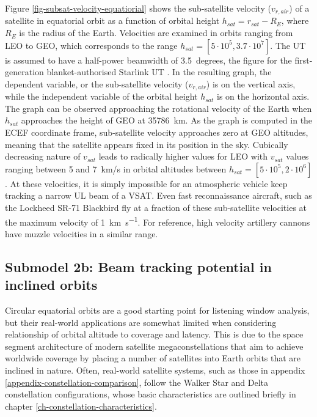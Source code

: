 \documentclass[english, 12pt, a4paper, elec, utf8, a-1b, online]{aaltothesis}
\begin{document}
Figure \ref{fig-subsat-velocity-equatiorial} shows the sub-satellite velocity ($v_{r, air}$) of a satellite in equatorial orbit as a function of orbital height $h_{sat} = r_{sat} - R_{E}$, where $R_{E}$ is the radius of the Earth.
Velocities are examined in orbits ranging from LEO to GEO, which corresponds to the range $h_{sat} = [5 \cdot 10^5, 3.7 \cdot 10^7]$. The UT is assumed to have a half-power beamwidth of 3.5~degrees, the figure for the first-generation blanket-authorised Starlink UT \cite{SpaceX-SES-AMD-20210731-01295}.
In the resulting graph, the dependent variable, or the sub-satellite velocity ($v_{r, air}$) is on the vertical axis, while the independent variable of the orbital height $h_{sat}$ is on the horizontal axis.
The graph can be observed approaching the rotational velocity of the Earth when $h_{sat}$ approaches the height of GEO at \SI{35786}{\kilo\meter}.
As the graph is computed in the ECEF coordinate frame, sub-satellite velocity approaches zero at GEO altitudes, meaning that the satellite appears fixed in its position in the sky.
Cubically decreasing nature of $v_{sat}$ leads to radically higher values for LEO with $v_{sat}$ values ranging between 5 and 7\ km/s in orbital altitudes between $h_{sat} = [5 \cdot 10^5, 2 \cdot 10^6]$.
At these velocities, it is simply impossible for an atmospheric vehicle keep tracking a narrow UL beam of a VSAT.
Even fast reconnaissance aircraft, such as the Lockheed SR-71 Blackbird fly at a fraction of these sub-satellite velocities at the maximum velocity of \SI{1}{\kilo\meter\per\second}.
For reference, high velocity artillery cannons have muzzle velocities in a similar range.

\subsection{Submodel 2b: Beam tracking potential in inclined orbits} \label{ch-results-submodel-2b-tracking-inclined}

Circular equatorial orbits are a good starting point for listening window analysis, but their real-world applications are somewhat limited when considering relationship of orbital altitude to coverage and latency.
This is due to the space segment architecture of modern satellite megaconstellations that aim to achieve worldwide coverage by placing a number of satellites into Earth orbits that are inclined in nature.
Often, real-world satellite systems, such as those in appendix \ref{appendix-constellation-comparison}, follow the Walker Star and Delta constellation configurations, whose basic characteristics are outlined briefly in chapter \ref{ch-constellation-characteristics}.
\end{document}
